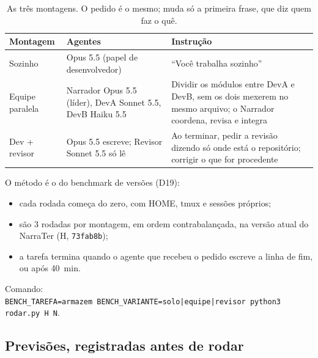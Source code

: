 \documentclass[11pt,a4paper]{article}
\begin{document}
\begin{table}[H]
\centering\small
\caption{As três montagens. O pedido é o mesmo; muda só a primeira frase, que diz quem faz o quê.}
\begin{tabularx}{\linewidth}{lYY}
\toprule
Montagem & Agentes & Instrução \\
\midrule
Sozinho & Opus 5.5 (papel de desenvolvedor) & ``Você trabalha sozinho'' \\
Equipe paralela & Narrador Opus 5.5 (líder), DevA Sonnet 5.5, DevB Haiku 5.5 & Dividir os módulos entre DevA e
DevB, sem os dois mexerem no mesmo arquivo; o Narrador coordena, revisa e integra \\
Dev + revisor & Opus 5.5 escreve; Revisor Sonnet 5.5 só lê & Ao terminar, pedir a revisão dizendo só onde está o
repositório; corrigir o que for procedente \\
\bottomrule
\end{tabularx}
\end{table}

O método é o do benchmark de versões (D19):
\begin{itemize}
  \item cada rodada começa do zero, com HOME, tmux e sessões próprios;
  \item são 3 rodadas por montagem, em ordem contrabalançada, na versão atual do NarraTer (H, \texttt{73fab8b});
  \item a tarefa termina quando o agente que recebeu o pedido escreve a linha de fim, ou após 40~min.
\end{itemize}
Comando:\\ \texttt{BENCH\_TAREFA=armazem BENCH\_VARIANTE=solo|equipe|revisor python3 rodar.py H N}.

\subsection{Previsões, registradas antes de rodar}
\end{document}
